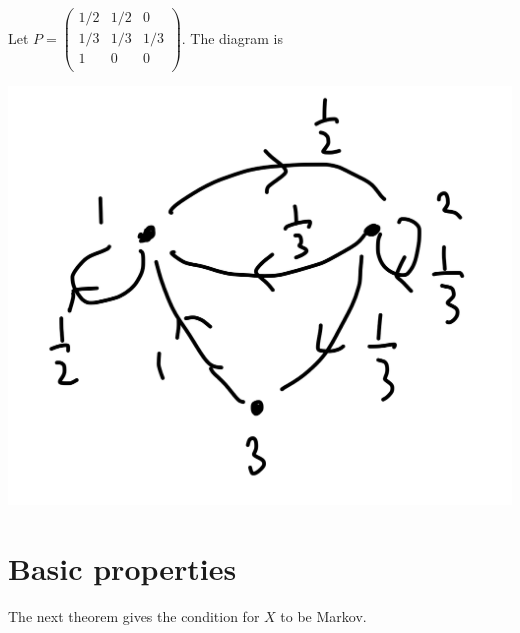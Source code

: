 \documentclass[a4paper,11pt]{article}
\begin{document}
\begin{example}
    Let $ P = \begin{pmatrix}
        1/2 & 1/2 & 0 \\
        1/3 & 1/3 & 1/3 \\
        1 & 0 & 0 \\
    \end{pmatrix} $. The diagram is
    \begin{center}
        \includegraphics[scale=0.09]{markov2.jpeg}
    \end{center}
\end{example}

\section{Basic properties}

The next theorem gives the condition for $X$ to be Markov.
\end{document}
